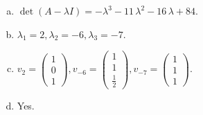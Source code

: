 \begin{questions}
\begin{solution}
\begin{enumerate}[(a)]
\item $\det(A-\lambda I)=-{\lambda}^{3} - 11 \, {\lambda}^{2} - 16 \, {\lambda} + 84$.
\item ${\lambda}_1=2, {\lambda}_2=-6, {\lambda}_3=-7$.
\item $v_{2}=\left(\begin{array}{r}
1 \\
0 \\
1
\end{array}\right), v_{-6}=\left(\begin{array}{r}
1 \\
1 \\
\frac{1}{2}
\end{array}\right), v_{-7}=\left(\begin{array}{r}
1 \\
1 \\
1
\end{array}\right)$.
\item Yes.
\end{enumerate}
\end{solution}

\end{questions}

\newpage


\begin{center}
\end{center}


